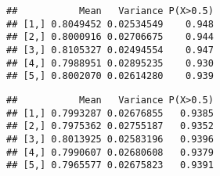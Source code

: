\begin{knitrout}
\begin{kframe}
\begin{alltt}
\hlstd{\}}



\hlstd{(}\hlstd{,} \hlstd{)}
\end{alltt}
\begin{verbatim}
##           Mean   Variance P(X>0.5)
## [1,] 0.8049452 0.02534549    0.948
## [2,] 0.8000916 0.02706675    0.944
## [3,] 0.8105327 0.02494554    0.947
## [4,] 0.7988951 0.02895235    0.930
## [5,] 0.8002070 0.02614280    0.939
\end{verbatim}
\begin{alltt}

\hlstd{(}\hlstd{,} \hlstd{)}
\end{alltt}
\begin{verbatim}
##           Mean   Variance P(X>0.5)
## [1,] 0.7993287 0.02676855   0.9385
## [2,] 0.7975362 0.02755187   0.9352
## [3,] 0.8013925 0.02583196   0.9396
## [4,] 0.7990607 0.02680608   0.9379
## [5,] 0.7965577 0.02675823   0.9391
\end{verbatim}
\begin{alltt}

\hlcom{###########################################################################}
\hlcom{###########################################################################}


\end{alltt}
\end{kframe}
\end{knitrout}
